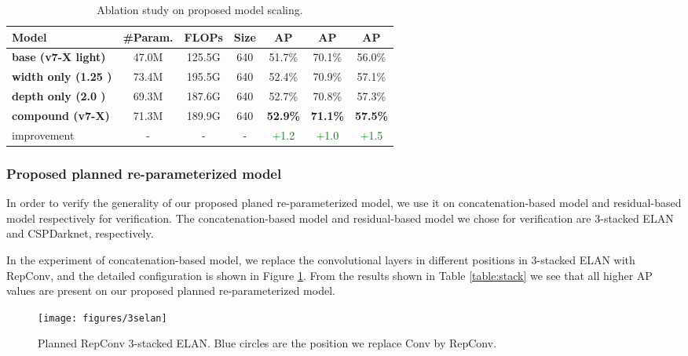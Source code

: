 \documentclass[10pt,twocolumn,letterpaper]{article}
\begin{document}
		\begin{table}[h]
			\centering
			\begin{threeparttable}[h]
				\footnotesize
				\caption{Ablation study on proposed model scaling.}
				\label{table:scale}
				\setlength\tabcolsep{2.0pt}
				\begin{tabular}{lcccccc}
					\toprule
					\textbf{Model} & \textbf{\#Param.} & \textbf{FLOPs} & \textbf{Size} & \textbf{AP} & \textbf{AP} & \textbf{AP} \\	
					\midrule
					\textbf{base (v7-X light)} & 47.0M & 125.5G & 640 & 51.7\% & 70.1\% & 56.0\% \\
					\textbf{width only (1.25 )} & 73.4M & 195.5G & 640 & 52.4\% & 70.9\% & 57.1\%\\
					\textbf{depth only (2.0 )} & 69.3M & 187.6G & 640 & 52.7\% & 70.8\% & 57.3\%\\
					\textbf{compound (v7-X)} & 71.3M & 189.9G & 640 & \textbf{52.9\%} & \textbf{71.1\%} & \textbf{57.5\%}\\
					improvement & - & - & - & \textcolor{green}{+1.2} & \textcolor{green}{+1.0} & \textcolor{green}{+1.5} \\
					\bottomrule
				\end{tabular}
\end{threeparttable}
		\end{table}
		
		\subsubsection{Proposed planned re-parameterized model}
		
		In order to verify the generality of our proposed planed re-parameterized model, we use it on concatenation-based model and residual-based model respectively for verification. The concatenation-based model and residual-based model we chose for verification are 3-stacked ELAN and CSPDarknet, respectively.
		
		In the experiment of concatenation-based model, we replace the  convolutional layers in different positions in 3-stacked ELAN with RepConv, and the detailed configuration is shown in Figure \ref{fig:3selan}. From the results shown in Table \ref{table:stack} we see that all higher AP values are present on our proposed planned re-parameterized model.
		


\begin{figure}[h]
			\begin{center}
				\texttt{[image: figures/3selan]}
			\end{center}
			\caption{Planned RepConv 3-stacked ELAN. Blue circles are the position we replace Conv by RepConv.}
			\label{fig:3selan}
\end{figure}
		
\end{document}
